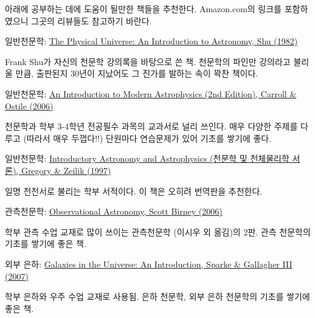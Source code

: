 아래에 공부하는 데에 도움이 될만한 책들을 추천한다. Amazon.com의 링크를
포함하였으니 그곳의 리뷰들도 참고하기 바란다.
\begin{packed_item}
\item 일반천문학:
  \href{http://www.amazon.com/Physical-Universe-Introduction-Astronomy-Books/dp/0935702059}{The
    Physical Universe: An Introduction to Astronomy, \textsf{Shu (1982)}}
\begin{packed_item}
\item Frank Shu가 자신의 천문학 강의록을 바탕으로 쓴 책. 천문학의 파인만 강의라고
  불리울 만큼, 출판된지 30년이 지났어도 그 진가를 발하는 속이 꽉찬 책이다.
\end{packed_item}

\item 일반천문학:
  \href{http://www.amazon.com/Introduction-Modern-Astrophysics-Bradley-Carroll/dp/0805304029}{An
    Introduction to Modern Astrophysics (2nd Edition), \textsf{Carroll \& Ostile
      (2006)}}
\begin{packed_item}
\item 천문학과 학부 3-4학년 전공필수 과목의 교과서로 널리 쓰인다. 매우 다양한
  주제를 다루고 (따라서 매우 두껍다!!) 단원마다 연습문제가 있어 기초를 쌓기에
  좋다.
\end{packed_item}

\item 일반천문학:
  \href{http://www.amazon.com/Introductory-Astronomy-Astrophysics-Saunders-Sunburst/dp/0030062284}{Introductory
    Astronomy and Astrophysics (천문학 및 천체물리학 서론), \textsf{Gregory \&
      Zeilik (1997)}}
\begin{packed_item}
\item 일명 천천서로 불리는 학부 서적이다. 이 책은 오히려 번역판을 추천한다.
\end{packed_item}

\item 관측천문학:
  \href{http://www.amazon.com/Observational-Astronomy-D-Scott-Birney/dp/0521853702}{Observational
    Astronomy, Scott \textsf{Birney (2006)}}
\begin{packed_item}
\item 학부 관측 수업 교재로 많이 쓰이는 관측천문학 (이시우 외 옮김)의 2판. 관측
  천문학의 기초를 쌓기에 좋은 책.
\end{packed_item}

\item 외부 은하:
  \href{http://www.amazon.com/Galaxies-Universe-Introduction-Linda-Sparke/dp/0521671868}{Galaxies
    in the Universe: An Introduction, \textsf{Sparke \& Gallagher III (2007)}}
\begin{packed_item}
\item 학부 은하와 우주 수업 교재로 사용됨. 은하 천문학, 외부 은하 천문학의 기초를
  쌓기에 좋은 책.
\end{packed_item}


\end{packed_item}
